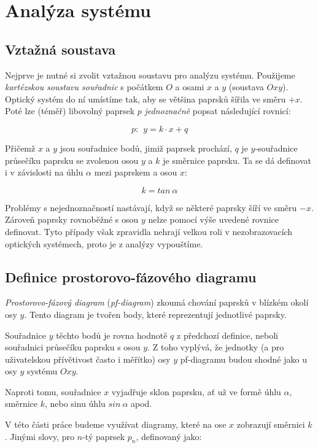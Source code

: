 \section{Analýza systému}

\subsection{Vztažná soustava}

Nejprve je nutné si zvolit vztažnou soustavu pro analýzu systému. Použijeme \emph{kartézskou soustavu souřadnic} s počátkem $O$ a osami $x$ a $y$ (soustava $Oxy$). Optický systém do ní umístíme tak, aby se většina paprsků šířila ve směru $+x$. Poté lze (téměř) libovolný paprsek $p$ \emph{jednoznačně} popsat následující rovnicí:

\[ p:\ \ y = k \cdot x + q \]

Přičemž $x$ a $y$ jsou souřadnice bodů, jimiž paprsek prochází, $q$ je $y$-souřadnice průsečíku paprsku se zvolenou osou $y$ a $k$ je směrnice paprsku. Ta se dá definovat i v závislosti na úhlu $\alpha$ mezi paprskem a osou $x$:

\[ k = tan\ \alpha \]

Problémy s nejednoznačností nastávají, když se některé paprsky šíří ve směru $-x$. Zároveň paprsky rovnoběžné s osou $y$ nelze pomocí výše uvedené rovnice definovat. Tyto případy však zpravidla nehrají velkou roli v nezobrazovacích optických systémech, proto je z analýzy vypouštíme.


\subsection{Definice prostorovo-fázového diagramu}

\emph{Prostorovo-fázový diagram} (\emph{pf-diagram}) zkoumá chování paprsků v blízkém okolí osy $y$. Tento diagram je tvořen body, které reprezentují jednotlivé paprsky.

Souřadnice $y$ těchto bodů je rovna hodnotě $q$ z předchozí definice, neboli souřadnici průsečíku paprsku s osou $y$. Z toho vyplývá, že jednotky (a pro uživatelskou přívětivost často i měřítko) osy $y$ pf-diagramu budou shodné jako u osy $y$ systému $Oxy$.

Naproti tomu, souřadnice $x$ vyjadřuje sklon paprsku, ať už ve formě úhlu $\alpha$, směrnice $k$, nebo sinu úhlu $sin\ \alpha$ apod.

V této části práce budeme využívat diagramy, které na ose $x$ zobrazují směrnici $k$. Jinými slovy, pro $n$-tý paprsek $p_n$, definovaný jako:

